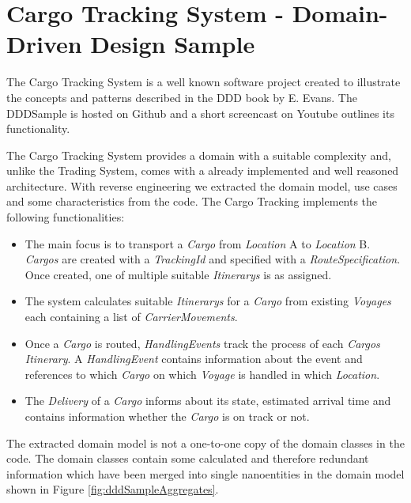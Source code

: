 \section{Cargo Tracking System - Domain-Driven Design Sample}
\label{sec:dddSample}

The Cargo Tracking System is a well known software project created to illustrate the concepts and patterns described in the \gls{DDD} book by E. Evans\cite{evans2003domain}. The DDDSample is hosted on Github\cite{dddGithub} and a short screencast on Youtube\cite{dddScreencast} outlines its functionality. 

The Cargo Tracking System provides a domain with a suitable complexity and, unlike the Trading System, comes with a already implemented and well reasoned architecture. With reverse engineering we extracted the domain model, use cases and some characteristics from the code. The Cargo Tracking implements the following functionalities:

\begin{itemize}
	\item The main focus is to transport a \textit{Cargo} from \textit{Location} A to \textit{Location} B. \textit{Cargos} are created with a \textit{TrackingId} and specified with a \textit{RouteSpecification}. Once created, one of multiple suitable \textit{Itinerarys} is as assigned.
	\item The system calculates suitable \textit{Itinerarys} for a \textit{Cargo} from existing \textit{Voyages} each containing a list of \textit{CarrierMovements}.
	\item Once a \textit{Cargo} is routed, \textit{HandlingEvents} track the process of each \textit{Cargos} \textit{Itinerary}. A \textit{HandlingEvent} contains information about the event and references to which \textit{Cargo} on which \textit{Voyage} is handled in which \textit{Location}. 
	\item The \textit{Delivery} of a \textit{Cargo} informs about its state, estimated arrival time and contains information whether the \textit{Cargo} is on track or not.
\end{itemize}

The extracted domain model is not a one-to-one copy of the domain classes in the code. The domain classes contain some calculated and therefore redundant information which have been merged into single nanoentities in the domain model shown in Figure \ref{fig:dddSampleAggregates}. 


